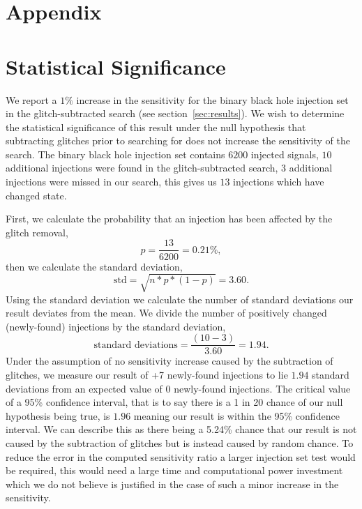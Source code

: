 \section*{Appendix}
\section{\label{sec:apdx_stat_sig}Statistical Significance}

We report a $1\%$ increase in the sensitivity for the binary black hole injection set in the glitch-subtracted \gw{} search (see section~\ref{sec:results}). We wish to determine the statistical significance of this result under the null hypothesis that subtracting \scl{} glitches prior to searching for \gws{} does not increase the sensitivity of the \gw{} search. The binary black hole injection set contains $6200$ injected signals, $10$ additional injections were found in the glitch-subtracted \gw{} search, $3$ additional injections were missed in our search, this gives us $13$ injections which have changed state.

First, we calculate the probability that an injection has been affected by the glitch removal, 
%
\begin{equation}
    p = \frac{13}{6200} = 0.21\% ,
\end{equation}
%
then we calculate the standard deviation, 
%
\begin{equation}
    \textrm{std} = \sqrt{n * p * (1 - p)} = 3.60 .
\end{equation}
%
Using the standard deviation we calculate the number of standard deviations our result deviates from the mean. We divide the number of positively changed (newly-found) injections by the standard deviation, 
%
\begin{equation}
    \textrm{standard deviations} = \frac{(10 - 3)}{3.60} = 1.94 .
\end{equation}
%
Under the assumption of no sensitivity increase caused by the subtraction of glitches, we measure our result of +7 newly-found \gw{} injections to lie $1.94$ standard deviations from an expected value of $0$ newly-found injections. The critical value of a 95\% confidence interval, that is to say there is a 1 in 20 chance of our null hypothesis being true, is $1.96$ meaning our result is within the 95\% confidence interval. We can describe this as there being a 5.24\% chance that our result is not caused by the subtraction of glitches but is instead caused by random chance. To reduce the error in the computed sensitivity ratio a larger injection set test would be required, this would need a large time and computational power investment which we do not believe is justified in the case of such a minor increase in the sensitivity.

